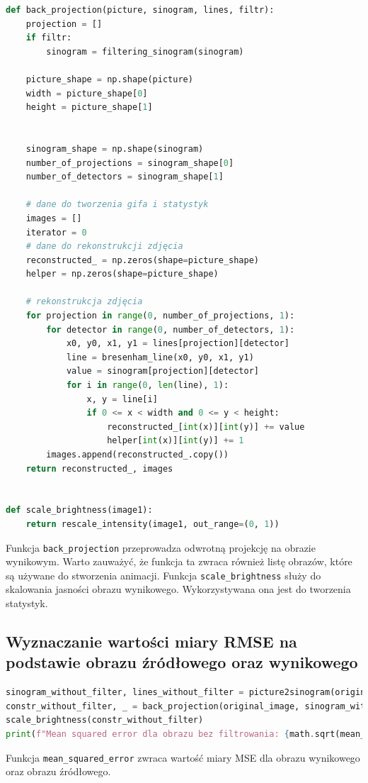 \documentclass[11pt,a4paper]{article}
\begin{document}
\begin{lstlisting}[language=Python, basicstyle=\normal, breaklines=true]
def back_projection(picture, sinogram, lines, filtr):
    projection = []
    if filtr:
        sinogram = filtering_sinogram(sinogram)

    picture_shape = np.shape(picture)
    width = picture_shape[0]
    height = picture_shape[1]


    sinogram_shape = np.shape(sinogram)
    number_of_projections = sinogram_shape[0]
    number_of_detectors = sinogram_shape[1]

    # dane do tworzenia gifa i statystyk
    images = []
    iterator = 0
    # dane do rekonstrukcji zdjęcia
    reconstructed_ = np.zeros(shape=picture_shape)
    helper = np.zeros(shape=picture_shape)

    # rekonstrukcja zdjęcia
    for projection in range(0, number_of_projections, 1):
        for detector in range(0, number_of_detectors, 1):
            x0, y0, x1, y1 = lines[projection][detector]
            line = bresenham_line(x0, y0, x1, y1)
            value = sinogram[projection][detector]
            for i in range(0, len(line), 1):
                x, y = line[i]
                if 0 <= x < width and 0 <= y < height:
                    reconstructed_[int(x)][int(y)] += value
                    helper[int(x)][int(y)] += 1
        images.append(reconstructed_.copy())
    return reconstructed_, images


def scale_brightness(image1):
    return rescale_intensity(image1, out_range=(0, 1))
\end{lstlisting}
    Funkcja \texttt{back\_projection} przeprowadza odwrotną projekcję na obrazie wynikowym.
    Warto zauważyć, że funkcja ta zwraca również listę obrazów, które są używane do stworzenia animacji. Funkcja \texttt{scale\_brightness} służy do skalowania jasności obrazu wynikowego.
    Wykorzystywana ona jest do tworzenia statystyk.
    \subsection{Wyznaczanie wartości miary RMSE na podstawie obrazu źródłowego oraz wynikowego}\label{sec:wyznaczanie-wartosci-miary-rmse-na-podstawie-obrazu-zrodowego-oraz-wynikowego}
    \begin{lstlisting}[language=Python, basicstyle=\normal, breaklines=true]
sinogram_without_filter, lines_without_filter = picture2sinogram(original_image, width, detector_amount, alpha)
constr_without_filter, _ = back_projection(original_image, sinogram_without_filter, lines_without_filter, False)
scale_brightness(constr_without_filter)
print(f"Mean squared error dla obrazu bez filtrowania: {math.sqrt(mean_squared_error(original_image, constr_without_filter))}")
\end{lstlisting}
    Funkcja \texttt{mean\_squared\_error} zwraca wartość miary MSE dla obrazu wynikowego oraz obrazu źródłowego.
\end{document}
